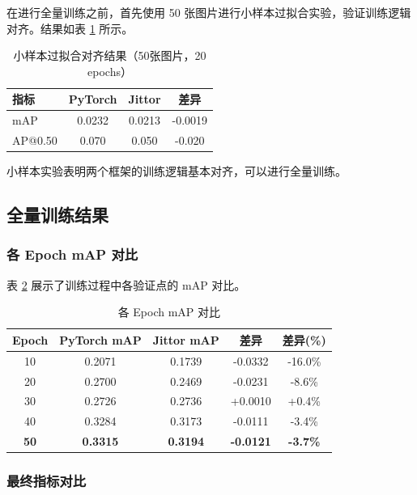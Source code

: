 \documentclass[12pt,a4paper]{article}
\begin{document}
在进行全量训练之前，首先使用 50 张图片进行小样本过拟合实验，验证训练逻辑对齐。结果如表 \ref{tab:small50} 所示。

\begin{table}[H]
\centering
\caption{小样本过拟合对齐结果（50张图片，20 epochs）}
\label{tab:small50}
\begin{tabular}{lccc}
\toprule
\textbf{指标} & \textbf{PyTorch} & \textbf{Jittor} & \textbf{差异} \\
\midrule
mAP & 0.0232 & 0.0213 & -0.0019 \\
AP@0.50 & 0.070 & 0.050 & -0.020 \\
\bottomrule
\end{tabular}
\end{table}

小样本实验表明两个框架的训练逻辑基本对齐，可以进行全量训练。

\subsection{全量训练结果}

\subsubsection{各 Epoch mAP 对比}

表 \ref{tab:map_comparison} 展示了训练过程中各验证点的 mAP 对比。

\begin{table}[H]
\centering
\caption{各 Epoch mAP 对比}
\label{tab:map_comparison}
\begin{tabular}{ccccc}
\toprule
\textbf{Epoch} & \textbf{PyTorch mAP} & \textbf{Jittor mAP} & \textbf{差异} & \textbf{差异(\%)} \\
\midrule
10 & 0.2071 & 0.1739 & -0.0332 & -16.0\% \\
20 & 0.2700 & 0.2469 & -0.0231 & -8.6\% \\
30 & 0.2726 & 0.2736 & +0.0010 & +0.4\% \\
40 & 0.3284 & 0.3173 & -0.0111 & -3.4\% \\
\textbf{50} & \textbf{0.3315} & \textbf{0.3194} & \textbf{-0.0121} & \textbf{-3.7\%} \\
\bottomrule
\end{tabular}
\end{table}

\subsubsection{最终指标对比}
\end{document}
